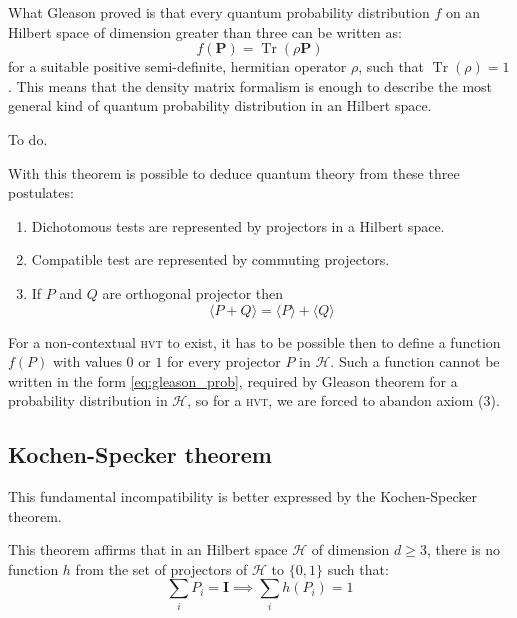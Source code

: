 \documentclass[a4paper]{article}
\DeclareMathOperator{\Tr}{Tr}
\newcommand{\Hil}{\mathcal{H}}
\newcommand{\op}[1]{\mathbf{#1}}
\newcommand{\acron}[1]{\textsc{#1}}
\newcommand{\HVT}{\acron{hvt}}
\newcommand{\I}{\mathbf{I}}
\theoremstyle{definition}
\let\oldproof\proof
\let\oldendproof\endproof
\renewenvironment{proof}
    {
        \begin{framed} 
        \oldproof
    }
    {
        \oldendproof 
        \end{framed}
    }
\begin{document}
What Gleason proved is that every quantum probability distribution $f$ on an Hilbert space
of dimension greater than three can be written as:
\begin{equation}
    f(\op P) = \Tr(\rho \op P)
    \label{eq:gleason_prob}
\end{equation}
for a suitable positive semi-definite, hermitian operator $\rho$, such that
$\Tr(\rho) = 1$.
This means that the density matrix formalism is enough to describe the most general kind of
quantum probability distribution in an Hilbert space.

\begin{proof}
    To do.
\end{proof}

With this theorem is possible to deduce quantum theory from these three
postulates:
\begin{enumerate}
    \item Dichotomous tests are represented by projectors in a Hilbert space.
    \item Compatible test are represented by commuting projectors.
    \item If $P$ and $Q$ are orthogonal projector then
        \begin{equation}
            \langle{P + Q}\rangle = \langle{P}\rangle + \langle{Q}\rangle
            \label{eq:QM_axiom3}
        \end{equation}
\end{enumerate}

For a non-contextual \HVT{} to exist, it has to be possible then to define a function $f(P)$ with values
$0$ or $1$ for every projector $P$ in $\Hil$.
Such a function cannot be written in the form \eqref{eq:gleason_prob}, required
by Gleason theorem for a probability distribution in $\Hil$, so for a \HVT{}, we
are forced to abandon axiom (3).

\subsection{Kochen-Specker theorem}
This fundamental incompatibility is better expressed by the Kochen-Specker
theorem.

This theorem affirms that in an Hilbert space $\Hil$ of dimension $d\ge 3$, there is no
function $h$ from the set of projectors of $\Hil$ to $\{0,1\}$ such that:
\begin{equation}
    \sum_i P_i = \I \implies \sum_i h(P_i) = 1 
    \label{eq:KS_function_prop}
\end{equation}
\end{document}
